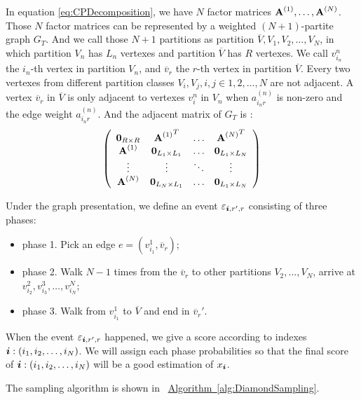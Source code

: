 \documentclass{article}
\newcommand{\Sca}[3]{{#1}^{(#2)}_{i_#2#3}}%
\newcommand{\V}[1]{{\bm{{\MakeLowercase{#1}}}}}%
\newcommand{\M}[1]{{\bm{\mathbf{\MakeUppercase{#1}}}}}%
\newcommand{\Mn}[2]{\M{#1}^{(#2)}}%
\newcommand{\Alg}[1]{\hyperref[alg:#1]{Algorithm~\ref*{alg:#1}}}
\begin{document}
In equation \ref{eq:CPDecomposition}, we have $N$ factor matrices $\Mn{A}{1},\dots,\Mn{A}{N}$.
Those $N$ factor matrices can be represented by a weighted $(N+1)$-partite graph $G_{T}$. And we call those $N+1$ partitions as partition $\overline{V},V_{1},V_{2},\ldots,V_{N}$, in which partition $V_{n}$ has $L_n$ vertexes and partition $\overline{V}$ has $R$ vertexes. We call $v^n_{i_n}$ the $i_n$-th vertex in partition $V_{n}$, and $\overline{v}_{r}$ the $r$-th vertex in partition $\overline{V}$. Every two vertexes from different partition classes $V_i,V_j,i,j\in {1,2,\ldots,N}$ are not adjacent. A vertex $\overline{v}_r$ in $\overline{V}$ is only adjacent to vertexes $v^n_i$ in $V_n$ when $\Sca{a}{n}{r}$ is non-zero and the edge weight $\Sca{a}{n}{r}$. And the adjacent matrix of $G_{T}$ is :
\[
\left(
  \begin{array}{cccc}
    \M{0}_{R\times R}   & {\Mn{A}{1}}^T         & \ldots & {\Mn{A}{N}}^T \\
    \Mn{A}{1}           & \M{0}_{L_1\times L_1} & \ldots & \M{0}_{L_1\times L_N} \\
    \vdots              & \vdots                & \ddots & \vdots \\
    \Mn{A}{N}           & \M{0}_{L_N\times L_1} & \ldots & \M{0}_{L_1\times L_N} \\
  \end{array}
\right)
\]

Under the graph presentation, we define an event $\varepsilon_{\V{i},r',r}$  consisting of three phases:
\begin{itemize}
  \item phase 1. Pick an edge $e=(v^1_{i_1},\overline{v}_r)$;
  \item phase 2. Walk $N-1$ times from the $\overline{v}_r$ to other partitions $V_2,\ldots,V_N$, arrive at $v^2_{i_2},v^3_{i_3},\ldots,v^N_{i_N}$;
  \item phase 3. Walk from $v^1_{i_1}$ to $\overline{V}$ and end in $\overline{v}_r'$.
\end{itemize}

When the event $\varepsilon_{\V{i},r',r}$ happened, we give a score according to indexes $\V{i}:(i_1,i_2,\ldots,i_N)$. We will assign each phase probabilities so that the final score of $\V{i}:(i_1,i_2,\ldots,i_N)$ will be a good estimation of $x_{\V{i}}$.

The sampling algorithm is shown in ~\Alg{DiamondSampling}.
\end{document}
